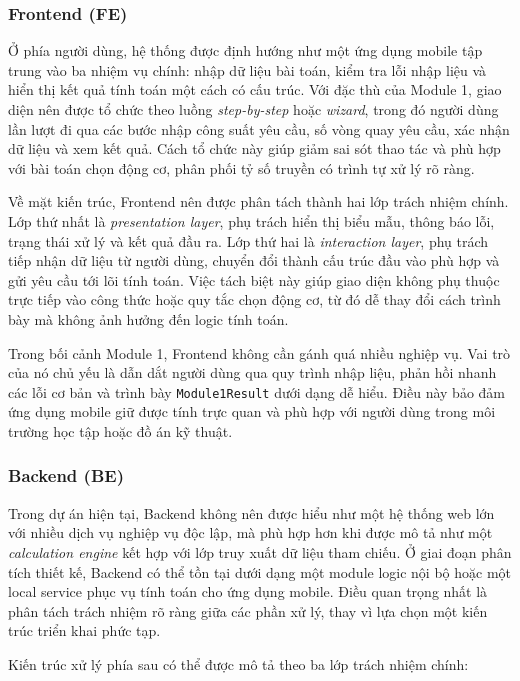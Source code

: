 \documentclass[a4paper]{article}
\begin{document}
\subsubsection{Frontend (FE)}

Ở phía người dùng, hệ thống được định hướng như một ứng dụng mobile tập trung vào ba nhiệm vụ chính: nhập dữ liệu bài toán, kiểm tra lỗi nhập liệu và hiển thị kết quả tính toán một cách có cấu trúc. Với đặc thù của Module 1, giao diện nên được tổ chức theo luồng \textit{step-by-step} hoặc \textit{wizard}, trong đó người dùng lần lượt đi qua các bước nhập công suất yêu cầu, số vòng quay yêu cầu, xác nhận dữ liệu và xem kết quả. Cách tổ chức này giúp giảm sai sót thao tác và phù hợp với bài toán chọn động cơ, phân phối tỷ số truyền có trình tự xử lý rõ ràng.

Về mặt kiến trúc, Frontend nên được phân tách thành hai lớp trách nhiệm chính. Lớp thứ nhất là \textit{presentation layer}, phụ trách hiển thị biểu mẫu, thông báo lỗi, trạng thái xử lý và kết quả đầu ra. Lớp thứ hai là \textit{interaction layer}, phụ trách tiếp nhận dữ liệu từ người dùng, chuyển đổi thành cấu trúc đầu vào phù hợp và gửi yêu cầu tới lõi tính toán. Việc tách biệt này giúp giao diện không phụ thuộc trực tiếp vào công thức hoặc quy tắc chọn động cơ, từ đó dễ thay đổi cách trình bày mà không ảnh hưởng đến logic tính toán.

Trong bối cảnh Module 1, Frontend không cần gánh quá nhiều nghiệp vụ. Vai trò của nó chủ yếu là dẫn dắt người dùng qua quy trình nhập liệu, phản hồi nhanh các lỗi cơ bản và trình bày \texttt{Module1Result} dưới dạng dễ hiểu. Điều này bảo đảm ứng dụng mobile giữ được tính trực quan và phù hợp với người dùng trong môi trường học tập hoặc đồ án kỹ thuật.

\subsubsection{Backend (BE)}

Trong dự án hiện tại, Backend không nên được hiểu như một hệ thống web lớn với nhiều dịch vụ nghiệp vụ độc lập, mà phù hợp hơn khi được mô tả như một \textit{calculation engine} kết hợp với lớp truy xuất dữ liệu tham chiếu. Ở giai đoạn phân tích thiết kế, Backend có thể tồn tại dưới dạng một module logic nội bộ hoặc một local service phục vụ tính toán cho ứng dụng mobile. Điều quan trọng nhất là phân tách trách nhiệm rõ ràng giữa các phần xử lý, thay vì lựa chọn một kiến trúc triển khai phức tạp.

Kiến trúc xử lý phía sau có thể được mô tả theo ba lớp trách nhiệm chính:
\end{document}
